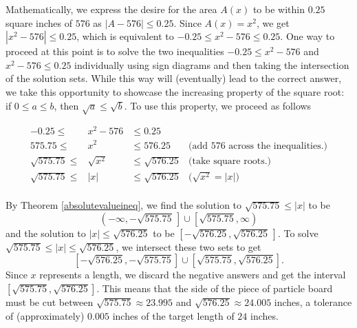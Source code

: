 {
Mathematically, we express the desire for the area $A(x)$ to be within $0.25$ square inches of $576$ as $|A - 576| \leq 0.25$.  Since $A(x) = x^2$, we get $|x^2 - 576| \leq 0.25$, which is equivalent to $-0.25 \leq x^2 - 576 \leq 0.25$.  One way to proceed at this point is to solve the two inequalities $-0.25 \leq x^2 - 576$ and $x^2 - 576 \leq 0.25$ individually using sign diagrams and then taking the intersection of the solution sets.  While this way will (eventually) lead to the correct answer, we take this opportunity to showcase the increasing property of the square root:  if $0 \leq a \leq b$, then $\sqrt{a} \leq \sqrt{b}$.  To use this property, we proceed as follows

\[ \begin{array}{rclr}

-0.25  \leq & x^2 - 576 & \leq 0.25 & \\
575.75 \leq & x^2 & \leq 576.25 & \text{(add $576$ across the inequalities.)} \\
\sqrt{575.75} \leq & \sqrt{x^2} & \leq \sqrt{576.25} & \text{(take square roots.)} \\
\sqrt{575.75} \leq & |x| & \leq \sqrt{576.25} & \text{($\sqrt{x^2} = |x|$)} \\ \end{array} \]

By Theorem \ref{absolutevalueineq}, we find the solution to $\sqrt{575.75} \leq |x|$ to be 
\[
\left(-\infty, -\sqrt{575.75} \, \right] \cup \left[\sqrt{575.75}, \infty \right)
\]
and the solution to $|x| \leq \sqrt{576.25}$ to be  $\left[-\sqrt{576.25}, \sqrt{576.25} \, \right]$. To solve $\sqrt{575.75} \leq  |x|  \leq \sqrt{576.25}$, we intersect these two sets to get 
\[
[-\sqrt{576.25}, -\sqrt{575.75}] \cup [\sqrt{575.75},\sqrt{576.25}].
\]
Since $x$ represents a length, we discard the negative answers and get  the interval $[\sqrt{575.75},\sqrt{576.25}]$.  This means that the side of the piece of particle board must be cut between $\sqrt{575.75} \approx 23.995$ and $\sqrt{576.25} \approx 24.005$ inches, a tolerance of (approximately) $0.005$ inches of the target length of $24$ inches. 
}

